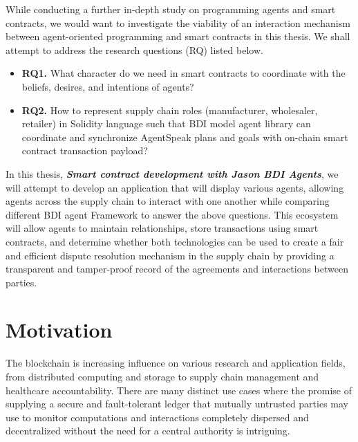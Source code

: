 \vspace{.5cm}
While conducting a further in-depth study on programming agents and smart contracts, we would want to investigate the viability of an interaction mechanism between agent-oriented programming and smart contracts in this thesis. We shall attempt to address the research questions (RQ) listed below.
\begin{itemize}[label={}]

\item \textbf{RQ1.}\label{RQ1.} What character do we need in smart contracts to coordinate with the beliefs, desires, and intentions of agents? \\

 \item \textbf{RQ2.}\label{RQ2.} How to represent supply chain roles (manufacturer, wholesaler, retailer) in Solidity language such that \ac{BDI} model agent library can coordinate and synchronize AgentSpeak plans and goals with on-chain smart contract transaction payload? \\
 
 
\end{itemize}

In this thesis, \textbf{\textit{Smart contract development with Jason \ac{BDI} Agents}}, we will attempt to develop an application that will display various agents, allowing agents across the supply chain to interact with one another while comparing different \ac{BDI} agent Framework to answer the above questions. This ecosystem will allow agents to maintain relationships, store transactions using smart contracts, and determine whether both technologies can be used to create a fair and efficient dispute resolution mechanism in the supply chain by providing a transparent and tamper-proof record of the agreements and interactions between parties.

\section{Motivation}

The blockchain is increasing influence on various research and application fields, from distributed computing and storage to supply chain management and healthcare accountability. There are many distinct use cases where the promise of supplying a secure and fault-tolerant ledger that mutually untrusted parties may use to monitor computations and interactions completely dispersed and decentralized without the need for a central authority is intriguing. 

